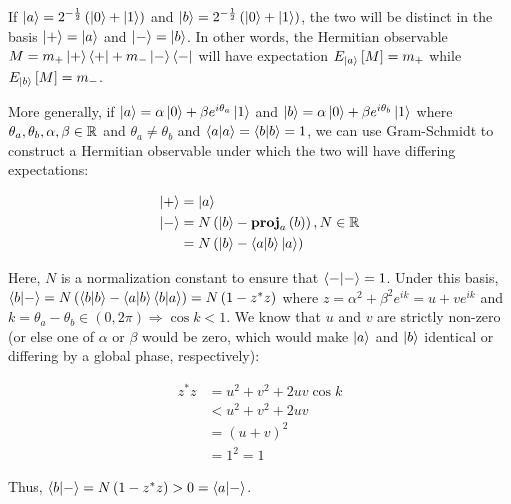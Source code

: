 \documentclass[all.tex]{subfiles}
\begin{document}
\ignorespaces
\parindent 0pt

\par If $\ket{a} = 2^{-\frac{1}{2}} \left( \ket{0} + \ket{1} \right)$ and
$\ket{b} = 2^{-\frac{1}{2}} \left( \ket{0} + \ket{1} \right)$, the two will be
distinct in the basis $\ket{+} = \ket{a}$ and $\ket{-} = \ket{b}$. In other
words, the Hermitian observable $M = m_{+} \ket{+} \bra{+} + m_{-} \ket{-}
\bra{-}$ will have expectation $E_{\ket{a}} \left[ M \right] = m_{+}$ while
$E_{\ket{b}} \left[ M \right] = m_{-}$.

\par More generally, if $\ket{a} = \alpha \ket{0} + \beta e^{i \theta_a}
\ket{1}$ and $\ket{b} = \alpha \ket{0} + \beta e^{i \theta_b} \ket{1}$ where
$\theta_a, \theta_b, \alpha, \beta \in \mathbb{R}$ and $\theta_a \ne \theta_b$ and
$\braket{a|a} = \braket{b|b} = 1$, we can use Gram-Schmidt to construct a
Hermitian observable under which the two will have differing expectations:

\begin{align}
\ket{+} &= \ket{a} \\
\ket{-} &= N \left( \ket{b} - \mathbf{proj}_a \left( b \right) \right), N \in
\mathbb{R} \\
&= N \left( \ket{b} - \braket{a|b} \ket{a} \right)
\end{align}

Here, $N$ is a normalization constant to ensure that $\braket{-|-} = 1$. Under
this basis, $\braket{b|-} = N \left( \braket{b|b} - \braket{a|b} \braket{b|a}
\right) = N \left( 1 - z^* z \right)$ where $z = \alpha^2 + \beta^2 e^{i k} = u
+ v e^{i k}$ and $k = \theta_a - \theta_b \in \left( 0, 2 \pi \right)
\Rightarrow \cos k < 1$. We know that $u$ and $v$ are strictly non-zero (or else
one of $\alpha$ or $\beta$ would be zero, which would make $\ket{a}$ and
$\ket{b}$ identical or differing by a global phase, respectively):

\begin{align}
z^* z &= u^2 + v^2 + 2 u v \cos k \\
&< u^2 + v^2 + 2 u v \\
&= \left( u + v \right)^2 \\
&= 1^2 = 1
\end{align}

Thus, $\braket{b|-} = N \left( 1 - z^* z \right) > 0 = \braket{a|-}$.
\end{document}
